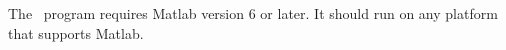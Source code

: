 The \sps\  program  
requires Matlab version 6 or later.
It should run
on  any platform that supports Matlab.
\cite{ANDER:AIM97,ANDER:AIM1,ANDER:AIM2}
